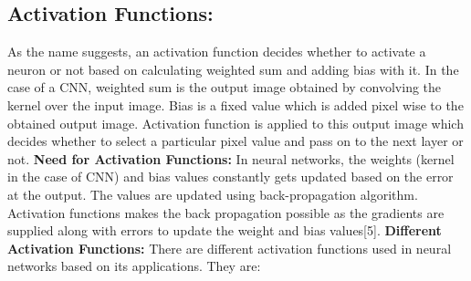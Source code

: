 \documentclass{IEEEtran}
\begin{document}
\subsection{\textbf{Activation Functions:}}
As the name suggests, an activation function decides whether to activate a neuron or not based on calculating weighted sum and adding bias with it. In the case of a CNN, weighted sum is the output image obtained by convolving the kernel over the input image. Bias is a fixed value which is added pixel wise to the obtained output image. Activation function is applied to this output image which decides whether to select a particular pixel value and pass on to the next layer or not. 
\newline
\textbf{Need for Activation Functions:} In neural networks, the weights (kernel in the case of CNN) and bias values constantly gets updated based on the error at the output. The values are updated using back-propagation algorithm. Activation functions makes the back propagation possible as the gradients are supplied along with errors to update the weight and bias values[5].
\newline
\textbf{Different Activation Functions:} There are different activation functions used in neural networks based on its applications. They are:
\end{document}
